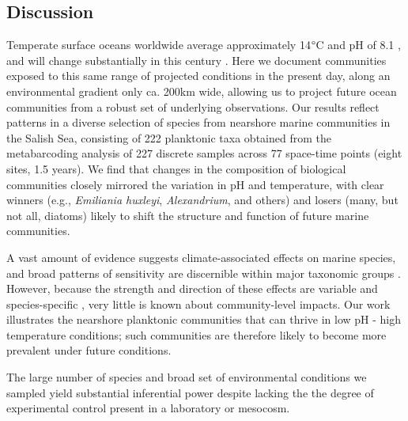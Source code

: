 \documentclass[11pt]{article}
\begin{document}
\begin{linenumbers}
\subsection*{Discussion}

Temperate surface oceans worldwide average approximately 14$\degree$C and pH of 8.1 \cite{bopp2013multiple}, and will change substantially in this century \citep[mean $\Delta$ T 2.5$\degree$C, $\Delta$ pH -0.35 globally; RCP 8.5;][]{gattuso2015contrasting}.  Here we document communities exposed to this same range of projected conditions in the present day, along an environmental gradient only ca. 200km wide, allowing us to project future ocean communities from a robust set of underlying observations. Our results reflect patterns in a diverse selection of species from nearshore marine communities in the Salish Sea, consisting of 222 planktonic taxa obtained from the metabarcoding analysis of 227 discrete samples across 77 space-time points (eight sites, 1.5 years). We find that changes in the composition of biological communities closely mirrored the variation in pH and temperature, with clear winners (e.g., \textit{Emiliania huxleyi}, \textit{Alexandrium}, and others) and losers (many, but not all, diatoms) likely to shift the structure and function of future marine communities.

A vast amount of evidence suggests climate-associated effects on marine species, and broad patterns of sensitivity are discernible within major taxonomic groups  \citep[][among many others]{gattuso2015contrasting, stock2017reconciling}. However, because the strength and direction of these effects are variable and species-specific \cite{kroeker2013impacts}, very little is known about community-level impacts. Our work illustrates the nearshore planktonic communities that can thrive in low pH - high temperature conditions; such communities are therefore likely to become more prevalent under future conditions. 

The large number of species and broad set of environmental conditions we sampled yield substantial inferential power despite lacking the the degree of experimental control present in a laboratory or mesocosm. 



\end{linenumbers}
\end{document}
